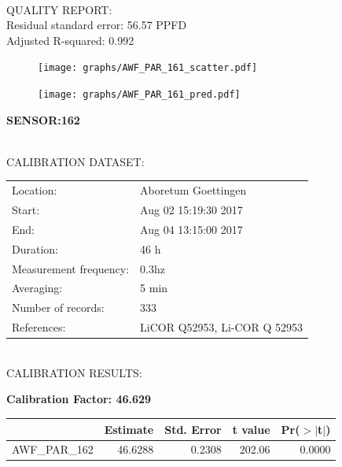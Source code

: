 \documentclass[oneside]{report}
\begin{document}
\hrulefill\\
QUALITY REPORT:\\
Residual standard error: 56.57 PPFD\\
Adjusted R-squared: 0.992



\begin{figure}[H]
  \centering
  \texttt{[image: graphs/AWF\_PAR\_161\_scatter.pdf]}
\end{figure}




\begin{figure}[H]
  \centering
  \texttt{[image: graphs/AWF\_PAR\_161\_pred.pdf]}
\end{figure}

\pagebreak


\begin{center}
\large{\textbf{SENSOR:162}}\\
\end{center}

\hrulefill\\
CALIBRATION DATASET:\\
\begin{table}[h!]
  \centering
  \label{tab:table1}
  \begin{tabular}{ll}
    Location: & Aboretum Goettingen\\ 
    
    
    Start:  & Aug 02 15:19:30 2017 \\
    End:   & Aug 04 13:15:00 2017\\ 
    Duration: & 46 h\\
    Measurement frequency: & 0.3hz\\
    Averaging:  &5 min\\
    Number of records: & 333 \\
    References: & LiCOR Q52953, Li-COR Q 52953 \\
  \end{tabular}
\end{table}

\hrulefill\\
CALIBRATION RESULTS:\\


\begin{center}
\textbf{\large{Calibration Factor: 46.629}}\\
\end{center}
\begin{table}[ht]
\centering
\begin{tabular}{rrrrr}
  \hline
 & Estimate & Std. Error & t value & Pr($>$$|$t$|$) \\ 
  \hline
AWF\_PAR\_162 & 46.6288 & 0.2308 & 202.06 & 0.0000 \\ 
   \hline
\end{tabular}
\end{table}
\end{document}
